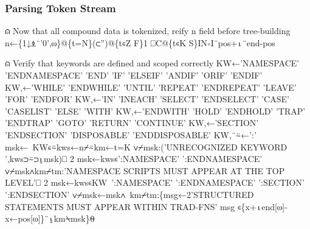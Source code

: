 \documentclass{article}%
\begin{document}
\subsubsection{Parsing Token Stream}

\nwenddocs{}\endmoddef\nwstartdeflinemarkup{}\nwenddeflinemarkup
⍝ Now that all compound data is tokenized, reify n field before tree-building
         n←\{1↓⍎¨'0',⍵\}@\{t=N\}(⊂'')@\{t∊Z F\}1 ⎕C@\{t∊K S\}IN∘I¨pos+⍳¨end-pos

⍝ Verify that keywords are defined and scoped correctly
         KW←'NAMESPACE' 'ENDNAMESPACE' 'END' 'IF' 'ELSEIF' 'ANDIF' 'ORIF' 'ENDIF'
         KW,←'WHILE' 'ENDWHILE' 'UNTIL' 'REPEAT' 'ENDREPEAT' 'LEAVE' 'FOR' 'ENDFOR'
         KW,←'IN' 'INEACH' 'SELECT' 'ENDSELECT' 'CASE' 'CASELIST' 'ELSE' 'WITH'
         KW,←'ENDWITH' 'HOLD' 'ENDHOLD' 'TRAP' 'ENDTRAP' 'GOTO' 'RETURN' 'CONTINUE'
         KW,←'SECTION' 'ENDSECTION' 'DISPOSABLE' 'ENDDISPOSABLE'
         KW,¨⍨←':'
         msk←~KW∊⍨kws←n⌿⍨km←t=K
         ∨⌿msk:('UNRECOGNIZED KEYWORD ',kws⊃⍨⊃⍸msk)⎕ 2
         msk←kws∊':NAMESPACE' ':ENDNAMESPACE'
         ∨⌿msk∧km⌿tm:'NAMESPACE SCRIPTS MUST APPEAR AT THE TOP LEVEL'⎕ 2
         msk←kws∊KW~':NAMESPACE' ':ENDNAMESPACE' ':SECTION' ':ENDSECTION'
         ∨⌿msk←msk∧~km⌿tm:\{msg←2'STRUCTURED STATEMENTS MUST APPEAR WITHIN TRAD-FNS'
                 msg  ∊\{x+⍳end[⍵]-x←pos[⍵]\}¨⍸km⍀msk\}⍬
\end{document}
